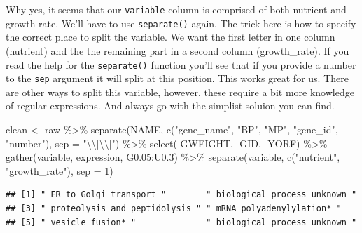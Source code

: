 \documentclass[
]{book}
\newenvironment{Shaded}{\begin{snugshade}}{\end{snugshade}}
\newcommand{\AttributeTok}[1]{\textcolor[rgb]{0.77,0.63,0.00}{#1}}
\newcommand{\DecValTok}[1]{\textcolor[rgb]{0.00,0.00,0.81}{#1}}
\newcommand{\FloatTok}[1]{\textcolor[rgb]{0.00,0.00,0.81}{#1}}
\newcommand{\FunctionTok}[1]{\textcolor[rgb]{0.00,0.00,0.00}{#1}}
\newcommand{\NormalTok}[1]{#1}
\newcommand{\OtherTok}[1]{\textcolor[rgb]{0.56,0.35,0.01}{#1}}
\newcommand{\SpecialCharTok}[1]{\textcolor[rgb]{0.00,0.00,0.00}{#1}}
\newcommand{\StringTok}[1]{\textcolor[rgb]{0.31,0.60,0.02}{#1}}
\begin{document}
Why yes, it seems that our \texttt{variable} column is comprised of both nutrient and growth rate. We'll have to use \texttt{separate()} again. The trick here is how to specify the correct place to split the variable. We want the first letter in one column (nutrient) and the the remaining part in a second column (growth\_rate). If you read the help for the \texttt{separate()} function you'll see that if you provide a number to the \texttt{sep} argument it will split at this position. This works great for us. There are other ways to split this variable, however, these require a bit more knowledge of regular expressions. And always go with the simplist soluion you can find.

\begin{Shaded}
\begin{Highlighting}[]
\NormalTok{clean }\OtherTok{\textless{}{-}}\NormalTok{ raw }\SpecialCharTok{\%\textgreater{}\%}
  \FunctionTok{separate}\NormalTok{(NAME, }\FunctionTok{c}\NormalTok{(}\StringTok{"gene\_name"}\NormalTok{, }\StringTok{"BP"}\NormalTok{, }\StringTok{"MP"}\NormalTok{, }\StringTok{"gene\_id"}\NormalTok{, }\StringTok{"number"}\NormalTok{), }\AttributeTok{sep =} \StringTok{"}\SpecialCharTok{\textbackslash{}\textbackslash{}}\StringTok{|}\SpecialCharTok{\textbackslash{}\textbackslash{}}\StringTok{|"}\NormalTok{) }\SpecialCharTok{\%\textgreater{}\%}
  \FunctionTok{select}\NormalTok{(}\SpecialCharTok{{-}}\NormalTok{GWEIGHT, }\SpecialCharTok{{-}}\NormalTok{GID, }\SpecialCharTok{{-}}\NormalTok{YORF) }\SpecialCharTok{\%\textgreater{}\%}
  \FunctionTok{gather}\NormalTok{(variable, expression, G0}\FloatTok{.05}\SpecialCharTok{:}\NormalTok{U0}\FloatTok{.3}\NormalTok{) }\SpecialCharTok{\%\textgreater{}\%}
  \FunctionTok{separate}\NormalTok{(variable, }\FunctionTok{c}\NormalTok{(}\StringTok{"nutrient"}\NormalTok{, }\StringTok{"growth\_rate"}\NormalTok{), }\AttributeTok{sep =} \DecValTok{1}\NormalTok{)}
\end{Highlighting}
\end{Shaded}

\begin{Shaded}
\end{Shaded}

\begin{verbatim}
## [1] " ER to Golgi transport "        " biological process unknown "  
## [3] " proteolysis and peptidolysis " " mRNA polyadenylylation* "     
## [5] " vesicle fusion* "              " biological process unknown "
\end{verbatim}
\end{document}
